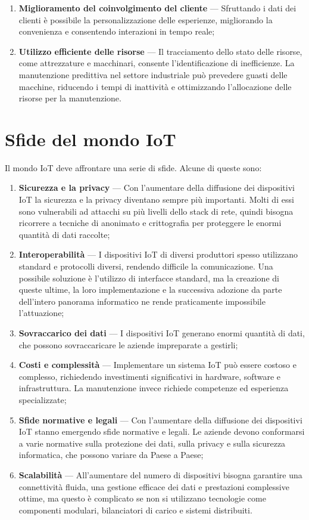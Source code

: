 \begin{enumerate}
    \item \textbf{Miglioramento del coinvolgimento del cliente} --- Sfruttando i dati dei clienti è possibile la personalizzazione delle esperienze, migliorando la convenienza e consentendo interazioni in tempo reale;
    \item \textbf{Utilizzo efficiente delle risorse} --- Il tracciamento dello stato delle risorse, come attrezzature e macchinari, consente l'identificazione di inefficienze. La manutenzione predittiva nel settore industriale può prevedere guasti delle macchine, riducendo i tempi di inattività e ottimizzando l'allocazione delle risorse per la manutenzione.
\end{enumerate}

\section{Sfide del mondo IoT}

Il mondo IoT deve affrontare una serie di sfide. Alcune di queste sono\cite{iot-challenge-1}\cite{iot-challenge-2}:
\begin{enumerate}
    \item \textbf{Sicurezza e la privacy} --- Con l'aumentare della diffusione dei dispositivi IoT la sicurezza e la privacy diventano sempre più importanti. Molti di essi sono vulnerabili ad attacchi su più livelli dello stack di rete, quindi bisogna ricorrere a tecniche di anonimato e crittografia per proteggere le enormi quantità di dati raccolte;
    \item \textbf{Interoperabilità} --- I dispositivi IoT di diversi produttori spesso utilizzano standard e protocolli diversi, rendendo difficile la comunicazione. Una possibile soluzione è l'utilizzo di interfacce standard, ma la creazione di queste ultime, la loro implementazione e la successiva adozione da parte dell'intero panorama informatico ne rende praticamente impossibile l'attuazione;
    \item \textbf{Sovraccarico dei dati} --- I dispositivi IoT generano enormi quantità di dati, che possono sovraccaricare le aziende impreparate a gestirli;
    \item \textbf{Costi e complessità} --- Implementare un sistema IoT può essere costoso e complesso, richiedendo investimenti significativi in hardware, software e infrastruttura. La manutenzione invece richiede competenze ed esperienza specializzate;
    \item \textbf{Sfide normative e legali} --- Con l'aumentare della diffusione dei dispositivi IoT stanno emergendo sfide normative e legali. Le aziende devono conformarsi a varie normative sulla protezione dei dati, sulla privacy e sulla sicurezza informatica, che possono variare da Paese a Paese;
    \item \textbf{Scalabilità} --- All'aumentare del numero di dispositivi bisogna garantire una connettività fluida, una gestione efficace dei dati e prestazioni complessive ottime, ma questo è complicato se non si utilizzano tecnologie come componenti modulari, bilanciatori di carico e sistemi distribuiti.
\end{enumerate} 
